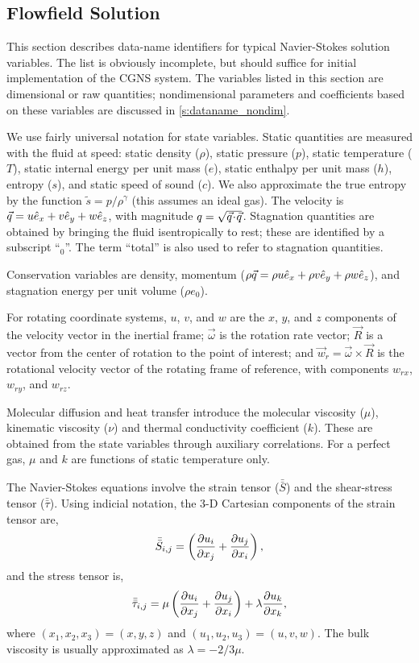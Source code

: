 \subsection{Flowfield Solution}
\label{s:dataname_flow}

This section describes data-name identifiers for typical Navier-Stokes
solution variables.  The list is obviously incomplete, but should
suffice for initial implementation of the CGNS system.  The variables
listed in this section are dimensional or raw quantities; nondimensional
parameters and coefficients based on these variables are discussed in
\autoref{s:dataname_nondim}.

We use fairly universal notation for state variables.  Static quantities
are measured with the fluid at speed: static density ($\rho$), static
pressure ($p$), static temperature ($T$), static internal energy per
unit mass ($e$), static enthalpy per unit mass ($h$), entropy ($s$),
and static speed of sound ($c$).  We also approximate the true entropy
by the function $\tilde{s} = p/\rho^\gamma$ (this assumes an ideal
gas).  The velocity is ${\vec{q}} = u \hat{e}_x + v \hat{e}_y + w \hat{e}_z$, with magnitude
$q = \sqrt{ {\vec{q}}\!\cdot\!{\vec{q}} }$. Stagnation quantities are obtained
by bringing the fluid isentropically to rest; these are identified
by a subscript ``${}_0$''.  The term ``total'' is also used to refer to
stagnation quantities.

Conservation variables are density, momentum
($\rho {\vec{q}} = \rho u \hat{e}_x + \rho v \hat{e}_y + \rho w \hat{e}_z$), and stagnation
energy per unit volume ($\rho e_0$).

For rotating coordinate systems, $u$, $v$, and $w$ are the $x$, $y$,
and $z$ components of the velocity vector in the inertial frame;
$\vec{\omega}$ is the rotation rate vector; $\vec{R}$ is a vector from
the center of rotation to the point of interest; and $\vec{w}_r =
\vec{\omega} \times \vec{R}$ is the rotational velocity vector of the
rotating frame of reference, with components $w_{rx}$, $w_{ry}$, and
$w_{rz}$.

Molecular diffusion and heat transfer introduce the molecular viscosity
($\mu$), kinematic viscosity ($\nu$) and thermal conductivity coefficient
($k$).  These are obtained from the state variables through auxiliary
correlations.  For a perfect gas, $\mu$ and $k$ are functions of static
temperature only.

The Navier-Stokes equations involve the strain tensor ($\bar{\bar{S}}$) and
the shear-stress tensor ($\bar{\bar{\tau}}$).  Using indicial notation, the
3-D Cartesian components of the strain tensor are,
$$
 \bar{\bar{S}}_{i,j} = \left( {\partial u_i \over \partial x_j} + {\partial u_j \over \partial x_i} \right),
$$
and the stress tensor is, 
$$
 \bar{\bar{\tau}}_{i,j} = \mu \left( {\partial u_i \over \partial x_j} + {\partial u_j \over \partial x_i} \right)
 + \lambda {\partial u_k \over \partial x_k},
$$
where $(x_1,x_2,x_3) = (x,y,z)$ and $(u_1,u_2,u_3) = (u,v,w)$.  The bulk
viscosity is usually approximated as $\lambda = -2/3 \mu$.  

